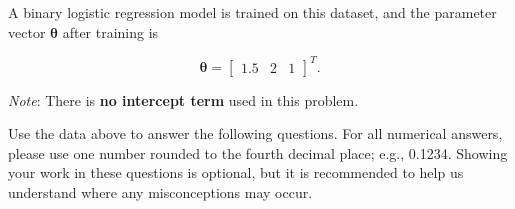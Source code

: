 \documentclass[11pt,addpoints,answers]{exam}
\newcommand{\thetav     }{\boldsymbol \theta     }
\begin{document}
\begin{questions}
\begin{center}
\begin{tabular}{|c|c|c|c|c|c|c|}
\end{tabular}
\end{center}

A binary logistic regression model is trained on this dataset, and the parameter vector $\thetav$ after training is

\[\thetav = \begin{bmatrix}1.5 & 2 & 1\end{bmatrix}^T.\]

\textit{Note}: There is \textbf{no intercept term} used in this problem.

Use the data above to answer the following questions. For all numerical answers, please use one number rounded to the fourth decimal place; e.g., 0.1234. Showing your work in these questions is optional, but it is recommended to help us understand where any misconceptions may occur.

\end{questions}
\end{document}
